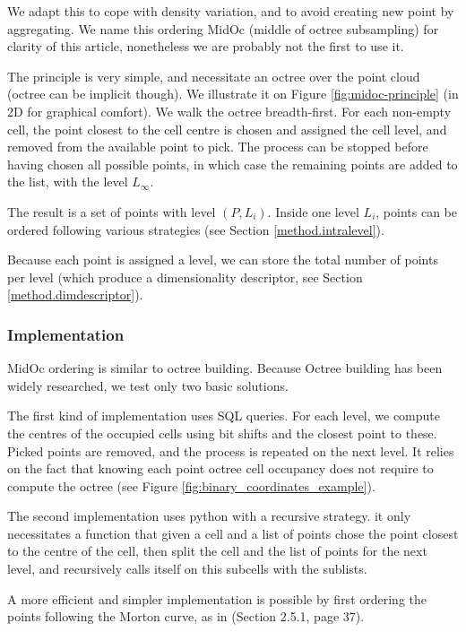 		We adapt this to cope with density variation, and to avoid creating new point by aggregating.   
		We name this ordering MidOc (middle of octree subsampling) for clarity of this article, nonetheless we are probably not the first to use it.
		
		The principle is very simple, and necessitate an octree over the point cloud (octree can be implicit though).
		We illustrate it on Figure \ref{fig:midoc-principle} (in 2D for graphical comfort).
		We walk the octree breadth-first.
		For each non-empty cell, the point closest to the cell centre is chosen and assigned the cell level,
		and removed from the available point to pick.
		The process can be stopped before having chosen all possible points,
		in which case the remaining points are added to the list, with the level $L_\infty$.
		
		The result is a set of points with level $(P,L_i)$.
		Inside one level $L_i$, points can be ordered following various strategies (see Section \ref{method.intralevel}).
		
		Because each point is assigned a level, we can store the total number of points per level (which produce a dimensionality descriptor, see Section \ref{method.dimdescriptor}).
		
		\subsubsection{Implementation}
		\label{method.midoc.implementation}
		MidOc ordering is similar to octree building. Because Octree building has been widely researched, we test only two basic solutions.
		
		The first kind of implementation uses SQL queries. For each level, we compute the centres of the occupied cells using bit shifts and the closest point to these. Picked points are removed, and the process is repeated on the next level.
		It relies on the fact that knowing each point octree cell occupancy does not require to compute the octree (see Figure \ref{fig:binary_coordinates_example}).
		
		The second implementation uses python with a recursive strategy. it only necessitates a function that given a cell and a list of points chose the point closest to the centre of the cell, then split the cell and the list of points for the next level, and recursively calls itself on this subcells with the sublists.
		
		A more efficient and simpler implementation is possible by first ordering the points following the Morton curve, as  in \cite{Feng2014} (Section 2.5.1, page 37). 
		
